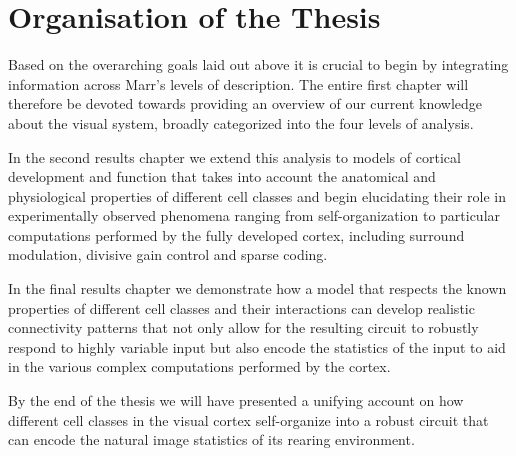 \section{Organisation of the Thesis}

Based on the overarching goals laid out above it is crucial to begin
by integrating information across Marr's levels of description. The
entire first chapter will therefore be devoted towards providing an
overview of our current knowledge about the visual system, broadly
categorized into the four levels of analysis.

In the second results chapter we extend this analysis to models of
cortical development and function that takes into account the
anatomical and physiological properties of different cell classes and
begin elucidating their role in experimentally observed phenomena
ranging from self-organization to particular computations performed by
the fully developed cortex, including surround modulation, divisive
gain control and sparse coding.

In the final results chapter we demonstrate how a model that respects
the known properties of different cell classes and their interactions
can develop realistic connectivity patterns that not only allow for
the resulting circuit to robustly respond to highly variable input but
also encode the statistics of the input to aid in the various complex
computations performed by the cortex.

By the end of the thesis we will have presented a unifying account on
how different cell classes in the visual cortex self-organize into a
robust circuit that can encode the natural image statistics of its
rearing environment.
